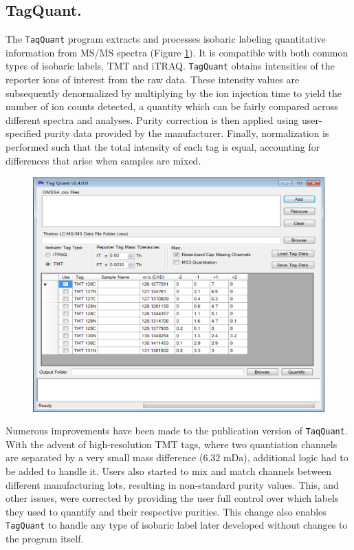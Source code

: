 \subsection*{TagQuant.}
The \texttt{TaqQuant} program extracts and processes isobaric labeling quantitative information from MS/MS spectra (Figure \ref{fig:tagquant}). It is compatible with both common types of isobaric labels, TMT and iTRAQ.\cite{tmt,itraq} \texttt{TagQuant} obtains intensities of the reporter ions of interest from the raw data. These intensity values are subsequently denormalized by multiplying by the ion injection time to yield the number of ion counts detected, a quantity which can be fairly compared across different spectra and analyses. Purity correction is then applied using user-specified purity data provided by the manufacturer.\cite{itracker} Finally, normalization is performed such that the total intensity of each tag is equal, accounting for differences that arise when samples are mixed.
\begin{figure}[p]
	\centering
	\includegraphics[width=\columnwidth]{csmsl/tagquant.png}
	\label{fig:tagquant}
\end{figure}

Numerous improvements have been made to the publication version of \texttt{TaqQuant}. With the advent of high-resolution TMT tags, where two quantiation channels are separated by a very small mass difference (6.32 mDa), additional logic had to be added to handle it.\cite{tmt8,tmt82} Users also started to mix and match channels between different manufacturing lots, resulting in non-standard purity values. This, and other issues, were corrected by providing the user full control over which labels they used to quantify and their respective purities. This change also enables \texttt{TagQuant} to handle any type of isobaric label later developed without changes to the program itself.

